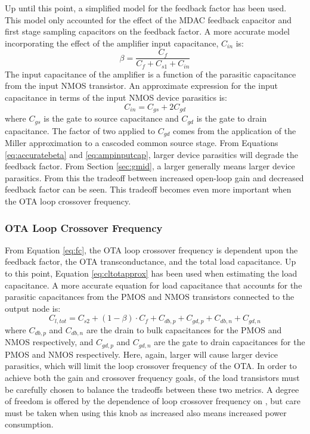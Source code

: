 Up until this point, a simplified model for the feedback factor has been used. This model only accounted for the effect of the MDAC feedback capacitor and first stage sampling capacitors on the feedback factor. A more accurate model incorporating the effect of the amplifier input capacitance, $C_{in}$ is:
\begin{equation}
\label{eq:accuratebeta}
\beta = \dfrac{C_{f}}{C_{f}+C_{s1}+C_{in}}
\end{equation}
The input capacitance of the amplifier is a function of the parasitic capacitance from the input NMOS transistor. An approximate expression for the input capacitance in terms of the input NMOS device parasitics is:
\begin{equation}
\label{eq:ampinputcap}
C_{in} = C_{gs} + 2C_{gd}
\end{equation}
where $C_{gs}$ is the gate to source capacitance and $C_{gd}$ is the gate to drain capacitance. The factor of two applied to $C_{gd}$ comes from the application of the Miller approximation to a cascoded common source stage. From Equations \ref{eq:accuratebeta} and \ref{eq:ampinputcap}, larger device parasitics will degrade the feedback factor. From Section \ref{sec:gmid}, a larger \gmid\spc generally means larger device parasitics. From this the tradeoff between increased open-loop gain and decreased feedback factor can be seen. This tradeoff becomes even more important when the OTA loop crossover frequency.
\subsubsection{OTA Loop Crossover Frequency}
From Equation \ref{eq:fc}, the OTA loop crossover frequency is dependent upon the feedback factor, the OTA transconductance, and the total load capacitance. Up to this point, Equation \ref{eq:cltotapprox} has been used when estimating the load capacitance. A more accurate equation for load capacitance that accounts for the parasitic capacitances from the PMOS and NMOS transistors connected to the output node is:
\begin{equation}
\label{eq:cltotexact}
C_{l,tot} = C_{s2} + (1-\beta)\cdot C_{f} + C_{db,p} + C_{gd,p} + C_{db,n} + C_{gd,n} 
\end{equation}
where $C_{db,p}$ and $C_{db,n}$ are the drain to bulk capacitances for the PMOS and NMOS respectively, and $C_{gd,p}$ and $C_{gd,n}$ are the gate to drain capacitances for the PMOS and NMOS respectively. Here, again, larger \gmid\spc will cause larger device parasitics, which will limit the loop crossover frequency of the OTA. In order to achieve both the gain and crossover frequency goals, \gmid\spc of the load transistors must be carefully chosen to balance the tradeoffs between these two metrics. A degree of freedom is offered by the dependence of loop crossover frequency on \Gm, but care must be taken when using this knob as increased \Gm\spc also means increased power consumption. 
